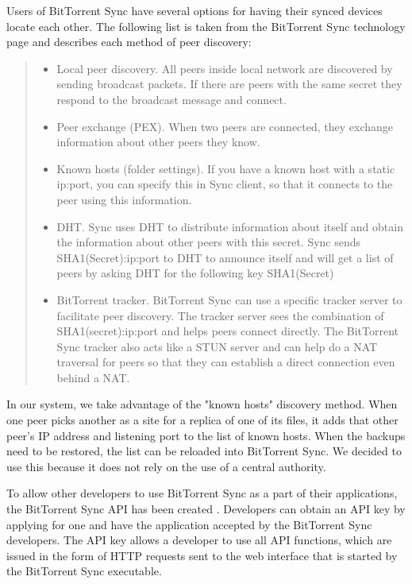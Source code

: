 \documentclass[12pt]{report}
\begin{document}
Users of BitTorrent Sync have several options for having their synced devices locate each other. The following list is taken from the BitTorrent Sync technology page \cite{btsynctech} and describes each method of peer discovery:

\begin{quote}
\begin{itemize}
\item Local peer discovery. All peers inside local network are discovered by sending broadcast packets. If there are peers with the same secret they respond to the broadcast message and connect.
\item Peer exchange (PEX). When two peers are connected, they exchange information about other peers they know.
\item Known hosts (folder settings). If you have a known host with a static ip:port, you can specify this in Sync client, so that it connects to the peer using this information.
\item DHT. Sync uses DHT to distribute information about itself and obtain the information about other peers with this secret. Sync sends SHA1(Secret):ip:port to DHT to announce itself and will get a list of peers by asking DHT for the following key SHA1(Secret)
\item BitTorrent tracker. BitTorrent Sync can use a specific tracker server to facilitate peer discovery. The tracker server sees the combination of SHA1(secret):ip:port and helps peers connect directly. The BitTorrent Sync tracker also acts like a STUN server and can help do a NAT traversal for peers so that they can establish a direct connection even behind a NAT.
\end{itemize}
\end{quote}

In our system, we take advantage of the "known hosts" discovery method. When one peer picks another as a site for a replica of one of its files, it adds that other peer's IP address and listening port to the list of known hosts. When the backups need to be restored, the list can be reloaded into BitTorrent Sync. We decided to use this because it does not rely on the use of a central authority.

To allow other developers to use BitTorrent Sync as a part of their applications, the BitTorrent Sync API has been created \cite{btsyncapi}. Developers can obtain an API key by applying for one and have the application accepted by the BitTorrent Sync developers. The API key allows a developer to use all API functions, which are issued in the form of HTTP requests sent to the web interface that is started by the BitTorrent Sync executable.
\end{document}
